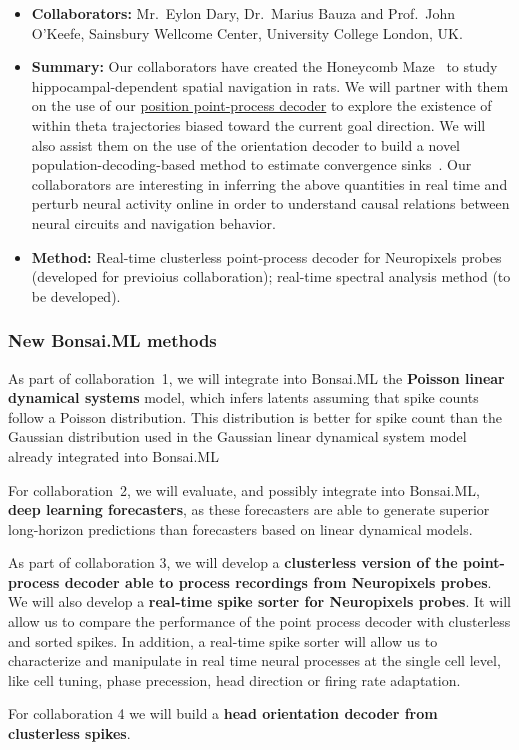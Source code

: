 \begin{itemize}

    \item\textbf{Collaborators:} Mr.~Eylon Dary, Dr.~Marius Bauza and
        Prof.~John O'Keefe, Sainsbury Wellcome Center, University College
        London, UK.

    \item\textbf{Summary:} Our collaborators have created the Honeycomb
        Maze~\citep{woodEtAl18} to study hippocampal-dependent spatial
        navigation in rats.
        We will partner with them on the use of our
        \href{https://bonsai-rx.org/machinelearning/examples/examples/PointProcessDecoder/DecodePositionFromHippocampusClusterless/README.html}{position
        point-process decoder} to explore the existence of within theta
        trajectories biased toward the current goal direction.
        We will also assist them on the use of the orientation decoder to build
        a novel population-decoding-based method to estimate convergence
        sinks~\citep{ormondEtAl24}.
        Our collaborators are interesting in inferring the above quantities in
        real time and perturb neural activity online in order to understand
        causal relations between neural circuits and navigation behavior.

    \item\textbf{Method:} Real-time clusterless point-process decoder for
        Neuropixels probes (developed for previoius collaboration); real-time
        spectral analysis method (to be developed).

\end{itemize}

\subsubsection{New Bonsai.ML methods}

As part of collaboration~1, we will integrate into Bonsai.ML the \textbf{Poisson
linear dynamical systems} model, which infers latents assuming that spike
counts follow a Poisson distribution. This distribution is better for spike
count than the Gaussian distribution used in the Gaussian linear dynamical
system model already integrated into Bonsai.ML

For collaboration~2, we will evaluate, and possibly integrate into Bonsai.ML,
\textbf{deep learning forecasters}, as these forecasters are able to generate
superior long-horizon predictions than forecasters based on linear dynamical
models.

As part of collaboration 3, we will develop a \textbf{clusterless version of
the point-process decoder able to process recordings from Neuropixels probes}.
%
We will also develop a \textbf{real-time spike sorter for Neuropixels probes}.
%
It will allow us to compare the performance of the point process decoder with
clusterless and sorted spikes.
%
In addition, a real-time spike sorter will allow us to characterize and
manipulate in real time neural processes at the single cell level, like cell
tuning, phase precession, head direction or firing rate adaptation.

For collaboration 4 we will build a \textbf{head orientation decoder from
clusterless spikes}.
